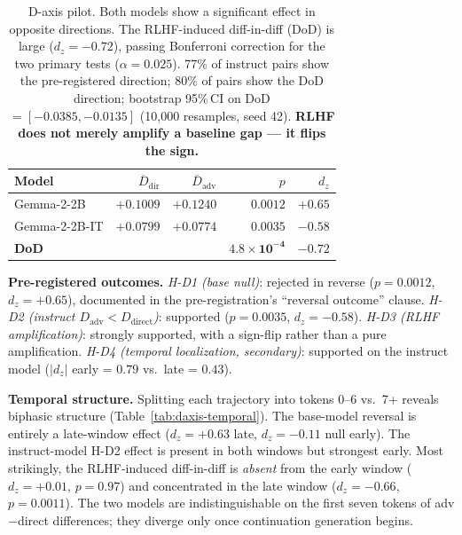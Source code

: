 \documentclass{article}
\begin{document}
\begin{table}[h]
\centering
\small
\begin{tabular}{lrrrr}
\toprule
Model & $\overline{D}_\text{dir}$ & $\overline{D}_\text{adv}$ & $p$ & $d_z$ \\
\midrule
Gemma-2-2B         & $+0.1009$ & $+0.1240$ & $0.0012$ & $+0.65$ \\
Gemma-2-2B-IT      & $+0.0799$ & $+0.0774$ & $0.0035$ & $-0.58$ \\
\midrule
\textbf{DoD}       &           &           & $\mathbf{4.8\!\times\!10^{-4}}$ & $\mathbf{-0.72}$ \\
\bottomrule
\end{tabular}
\caption{D-axis pilot. Both models show a significant effect in
opposite directions. The RLHF-induced diff-in-diff (DoD) is large
($d_z = -0.72$), passing Bonferroni correction for the two primary
tests ($\alpha = 0.025$). 77\% of instruct pairs show the
pre-registered direction; 80\% of pairs show the DoD direction;
bootstrap 95\%\,CI on DoD $= [-0.0385, -0.0135]$
(10{,}000 resamples, seed 42). \textbf{RLHF does not merely amplify
a baseline gap --- it flips the sign.}}
\label{tab:daxis}
\end{table}

\textbf{Pre-registered outcomes.}
\textit{H-D1 (base null)}: rejected in reverse
($p = 0.0012$, $d_z = +0.65$), documented in the pre-registration's
``reversal outcome'' clause.
\textit{H-D2 (instruct $D_\text{adv} < D_\text{direct}$)}: supported
($p = 0.0035$, $d_z = -0.58$).
\textit{H-D3 (RLHF amplification)}: strongly supported, with a
sign-flip rather than a pure amplification.
\textit{H-D4 (temporal localization, secondary)}: supported on the
instruct model ($|d_z|$ early = $0.79$ vs.\ late = $0.43$).

\textbf{Temporal structure.} Splitting each trajectory into
tokens 0--6 vs.\ 7+ reveals biphasic structure (Table~\ref{tab:daxis-temporal}).
The base-model reversal is entirely a late-window effect
($d_z = +0.63$ late, $d_z = -0.11$ null early). The instruct-model
H-D2 effect is present in both windows but strongest early. Most
strikingly, the RLHF-induced diff-in-diff is \textit{absent} from
the early window ($d_z = +0.01$, $p = 0.97$) and concentrated in
the late window ($d_z = -0.66$, $p = 0.0011$). The two models are
indistinguishable on the first seven tokens of adv$-$direct
differences; they diverge only once continuation generation begins.
\end{document}
